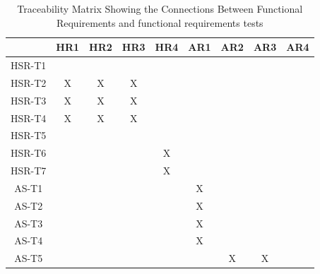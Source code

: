 \documentclass[12pt, oneside, openany, titlepage]{article}
\begin{document}
\begin{landscape}
\begin{table}[h!]
\centering
\begin{tabular}{|c|c|c|c|c|c|c|c|c|}
\hline
& HR1 & HR2 & HR3 & HR4 & AR1 & AR2 & AR3 & AR4 \\
\hline
HSR-T1        & & & & & & & & \\ \hline
HSR-T2        &X &X &X & & & & & \\ \hline
HSR-T3        &X &X &X & & & & & \\ \hline
HSR-T4        &X &X &X & & & & & \\ \hline
HSR-T5        & & & & & & & & \\ \hline
HSR-T6        & & & & X& & & & \\ \hline
HSR-T7        & & & & X& & & & \\ \hline
AS-T1         & & & & &X & & & \\ \hline
AS-T2        & & & & &X & & & \\ \hline
AS-T3        & & & & &X & & & \\ \hline
AS-T4        & & & & &X & & & \\ \hline
AS-T5        & & & & & &X &X & \\ \hline
\end{tabular}
\caption{Traceability Matrix Showing the Connections Between Functional Requirements and functional requirements tests}
\label{Table:A_trace}
\end{table}
\end{landscape}
\end{document}
